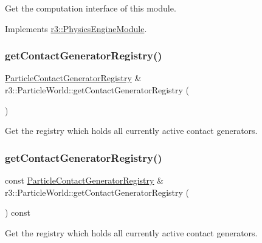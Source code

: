 Get the computation interface of this module. 

Implements \mbox{\hyperlink{classr3_1_1_physics_engine_module_a3b1d0d9bea0a82534f367f6d728312d3}{r3\+::\+Physics\+Engine\+Module}}.

\mbox{\label{classr3_1_1_particle_world_a85fc9fcf5c51a5bbce206a35a82f8ccf}} 
\subsubsection{\texorpdfstring{get\+Contact\+Generator\+Registry()}{getContactGeneratorRegistry()}\hspace{0.1cm}{\footnotesize\ttfamily [1/2]}}
{\footnotesize\ttfamily \mbox{\hyperlink{classr3_1_1_particle_contact_generator_registry}{Particle\+Contact\+Generator\+Registry}} \& r3\+::\+Particle\+World\+::get\+Contact\+Generator\+Registry (\begin{DoxyParamCaption}{ }\end{DoxyParamCaption})}

Get the registry which holds all currently active contact generators. \mbox{\label{classr3_1_1_particle_world_ab5cd3adaed73294927de72f3293b0709}} 
\subsubsection{\texorpdfstring{get\+Contact\+Generator\+Registry()}{getContactGeneratorRegistry()}\hspace{0.1cm}{\footnotesize\ttfamily [2/2]}}
{\footnotesize\ttfamily const \mbox{\hyperlink{classr3_1_1_particle_contact_generator_registry}{Particle\+Contact\+Generator\+Registry}} \& r3\+::\+Particle\+World\+::get\+Contact\+Generator\+Registry (\begin{DoxyParamCaption}{ }\end{DoxyParamCaption}) const}

Get the registry which holds all currently active contact generators. \mbox{\label{classr3_1_1_particle_world_aaa3f952fdfd8862673d41afa078245bf}} 
